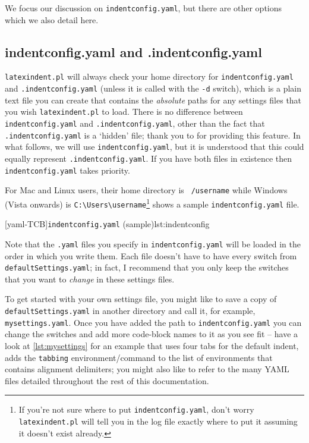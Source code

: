   We focus our discussion on \texttt{indentconfig.yaml}, but there are other options
  which we also detail here. 

 \subsection{indentconfig.yaml and .indentconfig.yaml}\label{sec:indentconfig}
  \texttt{latexindent.pl} will always check your home directory for
  \texttt{indentconfig.yaml}
  and \texttt{.indentconfig.yaml} (unless it is called with the \texttt{-d} switch), which
  is a plain text file you can create that contains the \emph{absolute} paths for any
  settings files that you wish \texttt{latexindent.pl} to load. There is no difference
  between \texttt{indentconfig.yaml} and \texttt{.indentconfig.yaml}, other than the fact
  that \texttt{.indentconfig.yaml} is a `hidden' file; thank you to
  \cite{jacobo-diaz-hidden-config} for providing this feature. In what follows, we will use
  \texttt{indentconfig.yaml}, but it is understood that this could equally represent
  \texttt{.indentconfig.yaml}. If you have both files in existence then
  \texttt{indentconfig.yaml} takes priority.

  For Mac and Linux users, their home directory is \texttt{~/username} while Windows
  (Vista onwards) is \lstinline!C:\Users\username!\footnote{If you're not sure where to
  put \texttt{indentconfig.yaml}, don't worry \texttt{latexindent.pl} will tell you in
  the log file exactly where to put it assuming it doesn't exist already.}
   shows a sample \texttt{indentconfig.yaml} file.

  [yaml-TCB]{\texttt{indentconfig.yaml} (sample)}{lst:indentconfig}

  Note that the \texttt{.yaml} files you specify in \texttt{indentconfig.yaml} will be
  loaded in the order in which you write them. Each file doesn't have to have every
  switch from \texttt{defaultSettings.yaml}; in fact, I recommend that you only keep the
  switches that you want to \emph{change} in these settings files.

  To get started with your own settings file, you might like to save a copy of
  \texttt{defaultSettings.yaml} in another directory and call it, for example,
  \texttt{mysettings.yaml}. Once you have added the path to \texttt{indentconfig.yaml}
  you can change the switches and add more code-block names to it as you see fit -- have
  a look at \cref{lst:mysettings} for an example that uses four tabs for the default
  indent, adds the \texttt{tabbing} environment/command to the list of environments that
  contains alignment delimiters; you might also like to refer to the many YAML files
  detailed throughout the rest of this documentation. 

